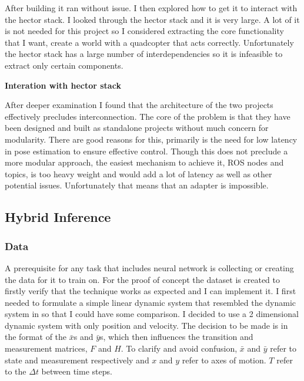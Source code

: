 \documentclass[]{../resources/final_report}
\begin{document}
After building it ran without issue. I then explored how to get it to interact with the hector stack. I looked through the hector stack and it is very large. A lot of it is not needed for this project so I considered extracting the core functionality that I want, create a world with a quadcopter that acts correctly. Unfortunately the hector stack has a large number of interdependencies so it is infeasible to extract only certain components.

\textbf{Interation with hector stack}

After deeper examination I found that the architecture of the two projects effectively precludes interconnection. The core of the problem is that they have been designed and built as standalone projects without much concern for modularity. There are good reasons for this, primarily is the need for low latency in pose estimation to ensure effective control. Though this does not preclude a more modular approach, the easiest mechanism to achieve it, ROS nodes and topics, is too heavy weight and would add a lot of latency as well as other potential issues. Unfortunately that means that an adapter is impossible.

\subsection{Hybrid Inference}

\subsubsection{Data}

A prerequisite for any task that includes neural network is collecting or creating the data for it to train on. For the proof of concept the dataset is created to firstly verify that the technique works as expected and I can implement it.
I first needed to formulate a simple linear dynamic system that resembled the dynamic system in \cite{Satorras2019CombiningGA} so that I could have some comparison. I decided to use a 2 dimensional dynamic system with only position and velocity. The decision to be made is in the format of the $\bar{x}$s and $\bar{y}$s, which then influences the transition and measurement matrices, $F$ and $H$. To clarify and avoid confusion, $\bar{x}$ and $\bar{y}$ refer to state and measurement respectively and $x$ and $y$ refer to axes of motion. $T$ refer to the $\Delta t$ between time steps.
\end{document}
